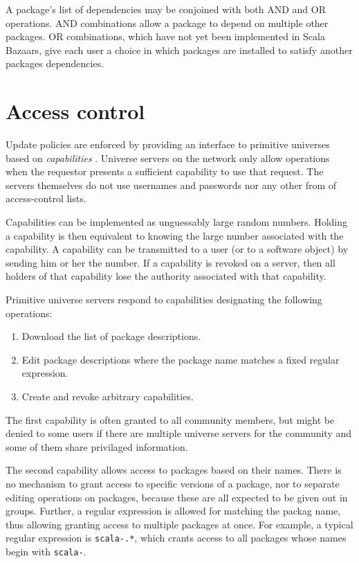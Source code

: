 \documentclass{article}
\begin{document}
A package's list of dependencies may be conjoined with both AND and OR
operations.  AND combinations allow a package to depend on multiple
other packages.  OR combinations, which have not yet been implemented
in Scala Bazaars, give each user a choice in which packages are
installed to satisfy another packages dependencies.


\section{Access control}

Update policies are enforced by providing an interface to primitive
universes based on \emph{capabilities} \cite{miller00:caps}.  Universe
servers on the network only allow operations when the requestor
presents a sufficient capability to use that request.  The servers
themselves do not use usernames and passwords nor any other from of
access-control lists.

Capabilities can be implemented as unguessably large random numbers.
Holding a capability is then equivalent to knowing the large number
associated with the capability.  A capability can be transmitted to a
user (or to a software object) by sending him or her the number.  If a
capability is revoked on a server, then all holders of that capability
lose the authority associated with that capability.


Primitive universe servers respond to capabilities designating the
following operations:
\begin{enumerate}
\item Download the list of package descriptions.
\item Edit package descriptions where the package
      name matches a fixed regular expression.
\item Create and revoke arbitrary capabilities.
\end{enumerate}
The first capability is often granted to all community members, but
might be denied to some users if there are multiple universe servers
for the community and some of them share privilaged information.

The second capability allows access to packages based on their names.
There is no mechanism to grant access to specific versions of a
package, nor to separate editing operations on packages, because these
are all expected to be given out in groups.  Further, a regular
expression is allowed for matching the packag name, thus allowing
granting access to multiple packages at once.  For example, a typical
regular expression is \texttt{scala-.*}, which crants access to all
packages whose names begin with \texttt{scala-}.
\end{document}
